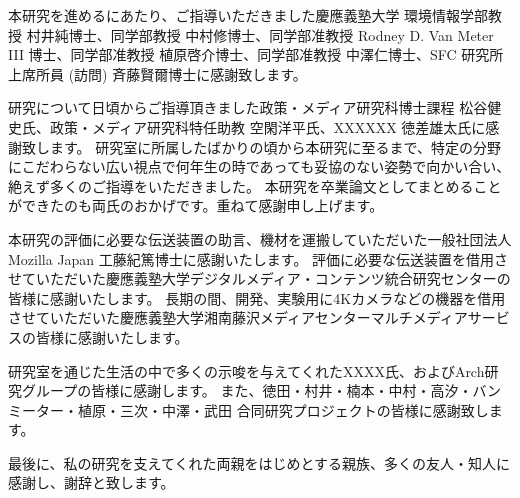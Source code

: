 \begin{acknowledgment}

本研究を進めるにあたり、ご指導いただきました慶應義塾大学 環境情報学部教授 村井純博士、同学部教授 中村修博士、同学部准教授 Rodney D. Van Meter III 博士、同学部准教授 植原啓介博士、同学部准教授 中澤仁博士、SFC 研究所 上席所員 (訪問) 斉藤賢爾博士に感謝致します。

研究について日頃からご指導頂きました政策・メディア研究科博士課程 松谷健史氏、政策・メディア研究科特任助教 空閑洋平氏、XXXXXX 徳差雄太氏に感謝致します。
研究室に所属したばかりの頃から本研究に至るまで、特定の分野にこだわらない広い視点で何年生の時であっても妥協のない姿勢で向かい合い、絶えず多くのご指導をいただきました。
本研究を卒業論文としてまとめることができたのも両氏のおかげです。重ねて感謝申し上げます。

本研究の評価に必要な伝送装置の助言、機材を運搬していただいた一般社団法人 Mozilla Japan 工藤紀篤博士に感謝いたします。
評価に必要な伝送装置を借用させていただいた慶應義塾大学デジタルメディア・コンテンツ統合研究センターの皆様に感謝いたします。
長期の間、開発、実験用に4Kカメラなどの機器を借用させていただいた慶應義塾大学湘南藤沢メディアセンターマルチメディアサービスの皆様に感謝いたします。

研究室を通じた生活の中で多くの示唆を与えてくれたXXXX氏、およびArch研究グループの皆様に感謝します。
また、徳田・村井・楠本・中村・高汐・バンミーター・植原・三次・中澤・武田 合同研究プロジェクトの皆様に感謝致します。

最後に、私の研究を支えてくれた両親をはじめとする親族、多くの友人・知人に感謝し、謝辞と致します。

\end{acknowledgment}
